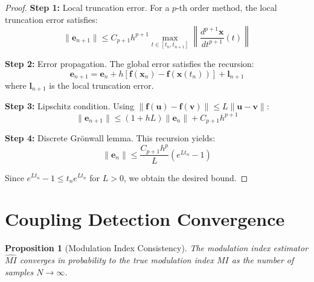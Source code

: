 \documentclass{article}
\newtheorem{proposition}{Proposition}
\begin{document}
\begin{proof}
\textbf{Step 1:} Local truncation error. For a $p$-th order method, the local truncation error satisfies:
\begin{equation}
\|\mathbf{e}_{n+1}\| \leq C_{p+1} h^{p+1} \max_{t \in [t_n, t_{n+1}]} \left\|\frac{d^{p+1}\mathbf{x}}{dt^{p+1}}(t)\right\|
\end{equation}

\textbf{Step 2:} Error propagation. The global error satisfies the recursion:
\begin{equation}
\mathbf{e}_{n+1} = \mathbf{e}_n + h[\mathbf{f}(\mathbf{x}_n) - \mathbf{f}(\mathbf{x}(t_n))] + \mathbf{l}_{n+1}
\end{equation}
where $\mathbf{l}_{n+1}$ is the local truncation error.

\textbf{Step 3:} Lipschitz condition. Using $\|\mathbf{f}(\mathbf{u}) - \mathbf{f}(\mathbf{v})\| \leq L\|\mathbf{u} - \mathbf{v}\|$:
\begin{equation}
\|\mathbf{e}_{n+1}\| \leq (1 + hL)\|\mathbf{e}_n\| + C_{p+1} h^{p+1}
\end{equation}

\textbf{Step 4:} Discrete Grönwall lemma. This recursion yields:
\begin{equation}
\|\mathbf{e}_n\| \leq \frac{C_{p+1} h^p}{L}(e^{Lt_n} - 1)
\end{equation}

Since $e^{Lt_n} - 1 \leq t_n e^{Lt_n}$ for $L > 0$, we obtain the desired bound.
\end{proof}

\section{Coupling Detection Convergence}

\begin{proposition}[Modulation Index Consistency]
The modulation index estimator $\hat{MI}$ converges in probability to the true modulation index $MI$ as the number of samples $N \to \infty$.
\end{proposition}
\end{document}
